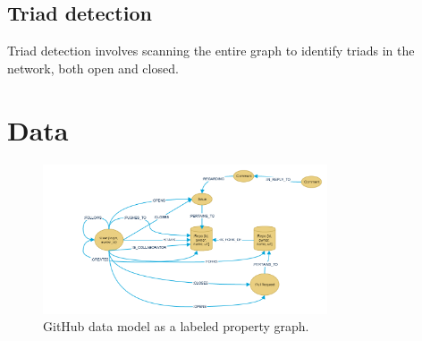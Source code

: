 \subsection{Triad detection}

%
%    


Triad detection involves scanning the entire graph to identify triads in the network, both open and closed.

%



\section{Data}


\begin{figure}[H]
  \centering
  \includegraphics[width=0.75\textwidth]{images/githubdatamodel.png}
  \caption[GitHub graph data model]{GitHub data model as a labeled property graph.}
  \label{github_data_model}
\end{figure}

